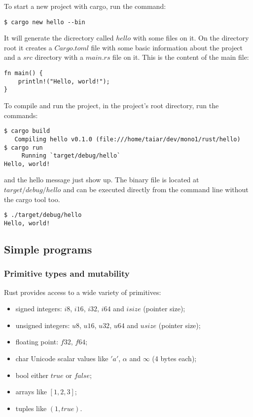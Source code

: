 To start a new project with cargo, run the command:

\begin{verbatim}
$ cargo new hello --bin
\end{verbatim}

It will generate the dicrectory called $hello$ with some files on it. On the
directory root it creates a $Cargo.toml$ file with some basic information about
the project and a $src$ directory with a $main.rs$ file on it. This is the
content of the main file:

\begin{lstlisting}[label=rhw,caption=Rust Hello World]
fn main() {
    println!("Hello, world!");
}
\end{lstlisting}

To compile and run the project, in the project's root directory, run the
commands:

\begin{verbatim}
$ cargo build
   Compiling hello v0.1.0 (file:///home/taiar/dev/mono1/rust/hello)
$ cargo run
     Running `target/debug/hello`
Hello, world!
\end{verbatim}

and the hello message just show up. The binary file is located at
$target/debug/hello$ and can be executed directly from the command line
without the cargo tool too.

\begin{verbatim}
$ ./target/debug/hello
Hello, world!
\end{verbatim}

\subsection{Simple programs}

\subsubsection{Primitive types and mutability}

Rust provides access to a wide variety of primitives:

\begin{itemize}
    \item signed integers: $i8$, $i16$, $i32$, $i64$ and $isize$ (pointer size);
    \item unsigned integers: $u8$, $u16$, $u32$, $u64$ and $usize$ (pointer size);
    \item floating point: $f32$, $f64$;
    \item char Unicode scalar values like $'a'$, $\alpha$ and $\infty$ (4 bytes each);
    \item bool either $true$ or $false$;
    \item arrays like $[1, 2, 3]$;
    \item tuples like $(1, true)$.
\end{itemize}

